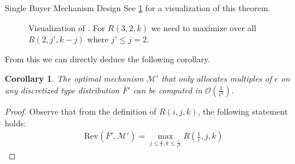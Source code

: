 \documentclass[11pt,a4paper]{article}
\newtheorem{corollary}[theorem]{Corollary}
\newcommand{\1}[1]{\mbox{\rm\bf 1}_{#1}}
\begin{document}
\begin{section}{Single Buyer Mechanism Design}
 See \cref{fig:fptas-recursion-formular} for a visualization of this theorem.

 \begin{figure}[htp!]
     \centering
     \caption{
         Visualization of . For $R(3,2,k)$ we need to maximize over all $R(2, j', k-j)$ where $j' \leq j = 2$.
     }
     \label{fig:fptas-recursion-formular}
 \end{figure}

 From this we can directly deduce the following corollary.

 \begin{corollary}
     The optimal mechanism $\mathcal{M}'$ that only allocates multiples of $\epsilon$ on any discretized type distribution $\bar{F}'$
     can be computed in $\mathcal{O}\left(\frac{1}{\epsilon^5}\right)$.
 \end{corollary}
 \begin{proof}
     Observe that from the definition of $R(i,j,k)$, the following statement holds:
     \begin{align*}
         \mathrm{Rev}(\bar{F}', \mathcal{M}') = \max_{j \leq \frac{1}{\epsilon}, k \leq \frac{1}{\epsilon^2}} R\left(\frac{1}{\epsilon}, j, k\right)
     \end{align*}


\end{proof}
\end{section}
\end{document}
